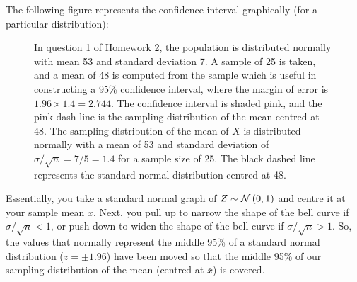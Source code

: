 \clearpage
The following figure represents the confidence interval graphically (for a particular distribution):
\FloatBarrier
\begin{figure}[h]
    \centering
{}
\caption{In \href{hw2q1}{question 1 of Homework 2}, the population is distributed normally with mean 53 and standard deviation 7. A sample of 25 is taken, and a mean of 48 is computed from the sample which is useful in constructing a 95\% confidence interval, where the margin of error is $1.96 \times 1.4 = 2.744$. The confidence interval is shaded pink, and the pink dash line is the sampling distribution of the mean centred at 48. The sampling distribution of the mean of $X$ is distributed normally with a mean of 53 and standard deviation of $\sigma/\sqrt{n} = 7/5 = 1.4$ for a sample size of 25. The black dashed line represents the standard normal distribution centred at 48.}
\label{fig:CI1}
\end{figure}
\FloatBarrier
Essentially, you take a standard normal graph of $Z \sim \mathcal{N} \left( 0,1\right)$ and centre it at your sample mean $\bar{x}$. Next, you pull up to narrow the shape of the bell curve if $\sigma/\sqrt{n}<1$, or push down to widen the shape of the bell curve if $\sigma/\sqrt{n}>1$. So, the values that normally represent the middle 95\% of a standard normal distribution ($z = \pm 1.96$) have been moved so that the middle 95\% of our sampling distribution of the mean (centred at $\bar{x}$) is covered. \\
